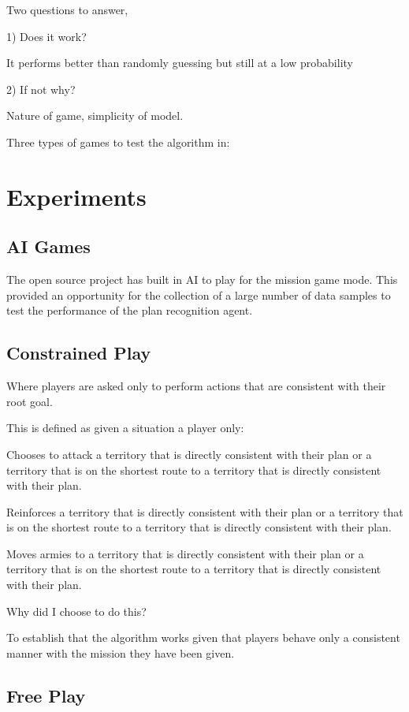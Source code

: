 \documentclass[parskip]{cs4rep}
\begin{document}
Two questions to answer, 

1) Does it work?

It performs better than randomly guessing but still at a low probability

2) If not why?

Nature of game, simplicity of model.

Three types of games to test the algorithm in:

\section{Experiments}

\subsection{AI Games}

The open source project has built in AI to play for the mission game mode. This provided an opportunity for the collection of a large number of data samples to test the performance of the plan recognition agent.

\subsection{Constrained Play}

Where players are asked only to perform actions that are consistent with their root goal.

This is defined as given a situation a player only:

Chooses to attack a territory that is directly consistent with their plan or a territory that is on the shortest route to a territory that is directly consistent with their plan.

Reinforces a territory that is directly consistent with their plan or a territory that is on the shortest route to a territory that is directly consistent with their plan.

Moves armies to a territory that is directly consistent with their plan or a territory that is on the shortest route to a territory that is directly consistent with their plan.

Why did I choose to do this?

To establish that the algorithm works given that players behave only a consistent manner with the mission they have been given.

\subsection{Free Play}
\end{document}
